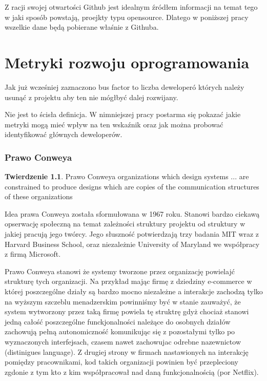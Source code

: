 \documentclass[a4paper,11pt,twoside]{report}
\theoremstyle{definition}
\newtheorem{theorem}{Twierdzenie}[chapter]
\begin{document}
Z racji swojej otwartości Github jest idealnym źródłem informacji na temat 
tego w jaki sposób powstają, proejkty typu opensource. Dlatego w poniższej 
pracy wszelkie dane będą pobierane właśnie z Githuba.


\chapter{Metryki rozwoju oprogramowania}

Jak już wcześniej zaznaczono bus factor to liczba deweloperó których 
należy usunąć z projektu aby ten nie mógłbyć dalej rozwijany.

Nie jest to ścisła definicja. W nimniejszej pracy postarma się pokazać 
jakie metryki mogą mieć wpływ na ten wskaźnik oraz jak można probować 
identyfikować głównych deweloperów.

\subsection{Prawo Conweya}

\begin{theorem}{Prawo Conweya}
organizations which design systems ... are constrained to produce designs which 
are copies of the communication structures of these organizations
\end{theorem}

Idea prawa Conweya została sformułowana w 1967 roku. Stanowi bardzo ciekawą 
opserwację społeczną na temat zależności struktury projektu od struktury w 
jakiej pracują jego twórcy. Jego słuszność potwierdzają trzy badania MIT 
wraz z Harvard Business School, oraz niezależnie  University of Maryland we 
współpracy z firmą Microsoft.

Prawo Conweya stanowi że systemy tworzone przez organizację powielajć 
strukturę tych organizacji.
Na przykład mając firmę z dziedziny e-commerce w której poszczególne 
działy są bardzo mocno niezależne a interakcje zachodzą tylko na wyższym 
szczeblu menadzerskim powinniśmy być w stanie zauważyć, że system 
wytworzony przez taką firmę powiela tę struktrę gdyż chociaż stanowi 
jedną całość poszczególne funckjonalności należące do osobnych 
działów zachowują pełną autonomiczność komunikując się z pozostałymi 
tylko po wyznaczonych interfejsach, czasem nawet zachowujac odrebne nazewnictow 
(distinigues language). Z drugiej strony w firmach nastawionych na interakcję 
pomiędzy pracownikami, kod takich organizacji powinien być przepleciony 
zgdonie z tym kto z kim współpracował nad daną funkcjonalnością (por 
Netflix).
\end{document}

